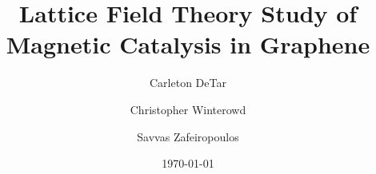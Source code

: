 \documentclass[aps,prd,twocolumn,showpacs,superscriptaddress,groupedaddress]{revtex4}  %
\begin{document}
\widetext

\newcommand{\beq}{\begin{eqnarray}}
\newcommand{\eeq}{\end{eqnarray}}
\newcommand{\nn}{ \nonumber}
\newcommand{\half}{\frac{1}{2}}
\newcommand{\chib}{{\bar \chi}}
\newcommand{\qb}{{\bar q}}
\newcommand{\Db}{{\bar {\cal D}}}
\newcommand{\D}{{\cal D}}
\newcommand{\ben}{\begin{enumerate}}
\newcommand{\een}{\end{enumerate}}
\newcommand{\bpsi}{{\bar \psi}}
\newcommand{\Bpsi}{{\bar \Psi}}
\newcommand{\etab}{{\bar \eta}}
\newcommand{\vev}[1]{{\langle #1 \rangle}}
\newcommand{\Dslash}{{\not \hspace{-4pt} D} }
\newcommand{\Dslashexp}{{\not \hspace{-1pt} D}}
\newcommand{\partialslash}{{\not \hspace{-4pt} \partial}}
\newcommand{\Aslash}{{\not \hspace{-4pt} A}}
\newcommand{\Pislash}{{\not \hspace{-4pt} \Pi}}
\newcommand{\Lcal}{{\cal L}}
\newcommand{\nnn}{ \nonumber \\ }
\newcommand{\ddd}{\nnn &&}
\newcommand{\angstrom}{\mbox{\normalfont\AA}}
\newcommand{\tr}{\mathop{{\hbox{Tr} \, }}\nolimits}
\def\etal{{\it et al.}}

\author{Carleton DeTar}
\author{Christopher Winterowd}
\author{Savvas Zafeiropoulos}
\title{Lattice Field Theory Study of Magnetic Catalysis in Graphene}
\date{\today}
\end{document}

